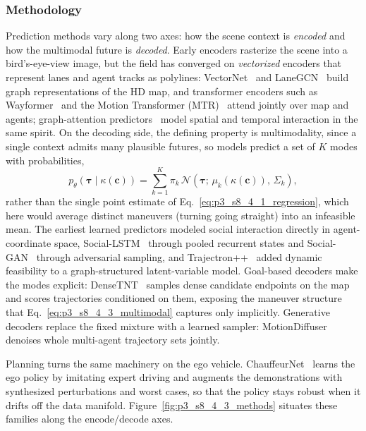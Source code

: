 \subsubsection{Methodology}
\label{subsubsec:p3_s8_4_3_method}
Prediction methods vary along two axes: how the scene context is \emph{encoded} and how the multimodal future is \emph{decoded}.
Early encoders rasterize the scene into a bird's-eye-view image, but the field has converged on \emph{vectorized} encoders that represent lanes and agent tracks as polylines: VectorNet~\cite{gao2020vectornet} and LaneGCN~\cite{liang2020lanegcn} build graph representations of the HD map, and transformer encoders such as Wayformer~\cite{nayakanti2023wayformer} and the Motion Transformer (MTR)~\cite{shi2022mtr} attend jointly over map and agents; graph-attention predictors~\cite{ZhangFWH22} model spatial and temporal interaction in the same spirit.
On the decoding side, the defining property is multimodality, since a single context admits many plausible futures, so models predict a set of $K$ modes with probabilities,
\begin{equation}
\label{eq:p3_s8_4_3_multimodal}
p_\theta(\boldsymbol{\tau}\mid\kappa(\mathbf{c}))=\sum_{k=1}^{K}\pi_k\,\mathcal{N}\!\left(\boldsymbol{\tau};\,\mu_k(\kappa(\mathbf{c})),\,\Sigma_k\right),
\end{equation}
rather than the single point estimate of Eq.~\eqref{eq:p3_s8_4_1_regression}, which here would average distinct maneuvers (turning \vs going straight) into an infeasible mean.
The earliest learned predictors modeled social interaction directly in agent-coordinate space, Social-LSTM~\cite{alahi2016social} through pooled recurrent states and Social-GAN~\cite{gupta2018social} through adversarial sampling, and Trajectron++~\cite{salzmann2020trajectron} added dynamic feasibility to a graph-structured latent-variable model.
Goal-based decoders make the modes explicit: DenseTNT~\cite{gu2021densetnt} samples dense candidate endpoints on the map and scores trajectories conditioned on them, exposing the maneuver structure that Eq.~\eqref{eq:p3_s8_4_3_multimodal} captures only implicitly.
Generative decoders replace the fixed mixture with a learned sampler: MotionDiffuser~\cite{jiang2023motiondiffuser} denoises whole multi-agent trajectory sets jointly.

Planning turns the same machinery on the ego vehicle. ChauffeurNet~\cite{bansal2019chauffeurnet} learns the ego policy by imitating expert driving and augments the demonstrations with synthesized perturbations and worst cases, so that the policy stays robust when it drifts off the data manifold.
Figure~\ref{fig:p3_s8_4_3_methods} situates these families along the encode/decode axes.


